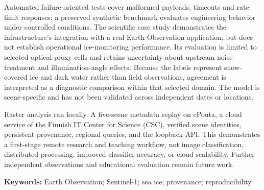 Automated failure-oriented tests cover malformed payloads, timeouts and rate-limit responses;
a preserved synthetic benchmark evaluates engineering behavior under controlled conditions.
The scientific case study demonstrates the infrastructure's integration with a real Earth
Observation application, but does not establish operational ice-monitoring performance. Its
evaluation is limited to selected optical-proxy cells and retains uncertainty about upstream
noise treatment and illumination-angle effects. Because the labels represent snow-covered ice
and dark water rather than field observations, agreement is interpreted as a diagnostic
comparison within that selected domain. The model is scene-specific and has not been validated
across independent dates or locations.

Raster analysis ran locally. A five-scene metadata replay on cPouta, a cloud service of the
Finnish IT Center for Science (CSC), verified scene identities, persistent provenance, regional
queries, and the loopback API. This demonstrates a first-stage remote research and teaching
workflow, not image classification, distributed processing, improved classifier accuracy, or
cloud scalability. Further independent observations and educational evaluation remain future
work.

\par\medskip\noindent\textbf{Keywords:} Earth Observation; Sentinel-1; sea ice; provenance; reproducibility
\endgroup
